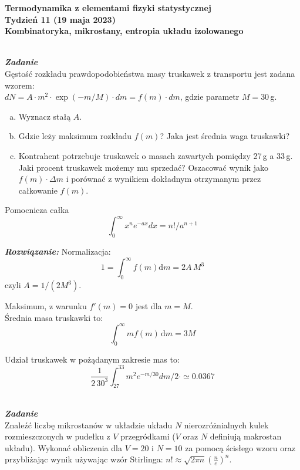 \documentclass[11pt,a4paper]{article}
\newcounter{zadanie}\newcommand{\zadanie}[1][]{\addtocounter{zadanie}{1} ~\\  {\bf \emph{Zadanie \arabic{zadanie} #1 }} \\}
\begin{document}

\begin{centering}
\bf{\Large{Termodynamika z elementami fizyki statystycznej}}\\
Tydzień 11 (19 maja 2023)\\[0mm]
Kombinatoryka, mikrostany, entropia układu izolowanego\\
\end{centering} 
\vspace{5mm}

\zadanie
Gęstość rozkładu prawdopodobieństwa masy truskawek z transportu jest zadana wzorem:\\
$dN = A \cdot m^2 \cdot \exp(-m/M) \cdot dm = f(m) \cdot dm$, gdzie parametr $M = 30\,$g.
\begin{enumerate}[a)]
\item Wyznacz stałą $A$.
\item Gdzie leży maksimum rozkładu $f(m)$? Jaka jest średnia waga truskawki?
\item Kontrahent potrzebuje truskawek o masach zawartych pomiędzy 27\,g a 33\,g. Jaki procent truskawek możemy mu sprzedać?
Oszacować wynik jako $f(m)\cdot \Delta m$ i porównać z wynikiem dokładnym otrzymanym przez całkowanie $f(m)$.
\end{enumerate}
Pomocnicza całka
\[
\int_0^\infty x^n e^{-ax}dx=n!/a^{n+1}
\]

\vspace{0.5cm}
{\bf \em Rozwiązanie:} Normalizacja:
\[
1= \int_0^{\infty} f(m)\mathrm{d}m= 2A\,M^3
\]
czyli $A=1/(2M^3)$.

Maksimum, z warunku $f'(m)=0$ jest dla $m=M$.\\

Średnia masa truskawki to:
\[
\int_0^{\infty} m f(m)\,\mathrm{d}m= 3M
\]

Udział truskawek w pożądanym zakresie mas to:
\[
\frac{1}{2\,30^3}\int_{27}^{33}m^2e^{-m/30}dm/2\cdot\simeq 0.0367
\]

\begin{figure}\vspace{0mm}
\end{figure}
\zadanie
Znaleźć liczbę mikrostanów w układzie układu $N$ nierozróżnialnych kulek rozmieszczonych w pudełku z $V$ przegródkami ($V$ oraz $N$ definiują makrostan układu). Wykonać obliczenia dla $V = 20$ i $N = 10$ za pomocą ścisłego wzoru oraz przybliżając wynik używając wzór Stirlinga: $\displaystyle n! \approx \sqrt{2 \pi n} \left(\frac{n}{e}\right)^n$.
\vspace{5mm}
\end{document}

